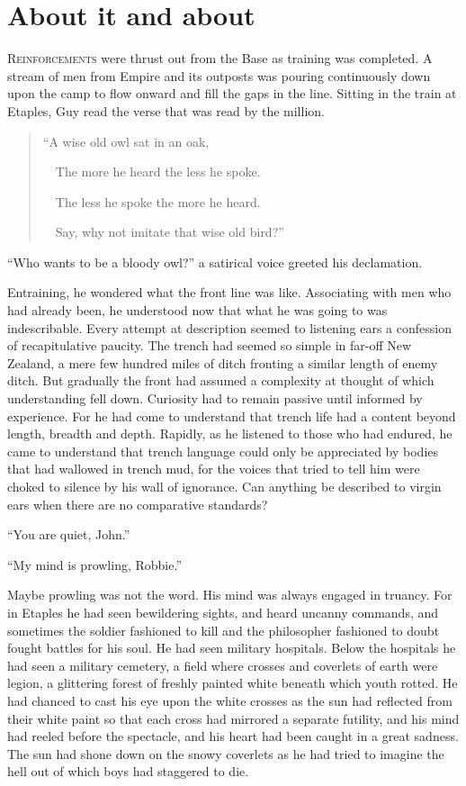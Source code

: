 \chapter*{\textsf{About it and about}}

R\textsc{einforcements} were thrust out from the Base as training 
was completed. A stream of men from Empire and its outposts was 
pouring continuously down upon the camp to flow onward and fill the 
gaps in the line. Sitting in the train at Etaples, Guy read the verse 
that was read by the million.

\begin{verse}
``A wise old owl sat in an oak,

\ \ The more he heard the less he spoke.

\ \ The less he spoke the more he heard.

\ \ Say, why not imitate that wise old bird?''
\end{verse}

``Who wants to be a bloody owl?'' a satirical voice greeted his declamation.

Entraining, he wondered what the front line was like. Associating with men who 
had already been, he understood now that what he was going to was indescribable. 
Every attempt at description seemed to listening ears a confession of recapitulative 
paucity. The trench had seemed so simple in far-off New Zealand, a mere few hundred 
miles of ditch fronting a similar length of enemy ditch. But gradually the front 
had assumed a complexity at thought of which understanding fell down. Curiosity had 
to remain passive until informed by experience. For he had come to understand that 
trench life had a content beyond length, breadth and depth. Rapidly, as he listened 
to those who had endured, he came to understand that trench language could only be 
appreciated by bodies that had wallowed in trench mud, for the voices that tried to 
tell him were choked to silence by his wall of ignorance. Can anything be described 
to virgin ears when there are no comparative standards?

``You are quiet, John.''

``My mind is prowling, Robbie.''

Maybe prowling was not the word. His mind was always engaged in truancy. For in Etaples 
he had seen bewildering sights, and heard uncanny commands, and sometimes the soldier 
fashioned to kill and the philosopher fashioned to doubt fought battles for his soul. 
He had seen military hospitals. Below the hospitals he had seen a military cemetery, 
a field where crosses and coverlets of earth were legion, a glittering forest of 
freshly painted white beneath which youth rotted. He had chanced to cast his eye 
upon the white crosses as the sun had reflected from their white paint so that each 
cross had mirrored a separate futility, and his mind had reeled before the spectacle, 
and his heart had been caught in a great sadness. The sun had shone down on the 
snowy coverlets as he had tried to imagine the hell out of which boys had staggered 
to die.


